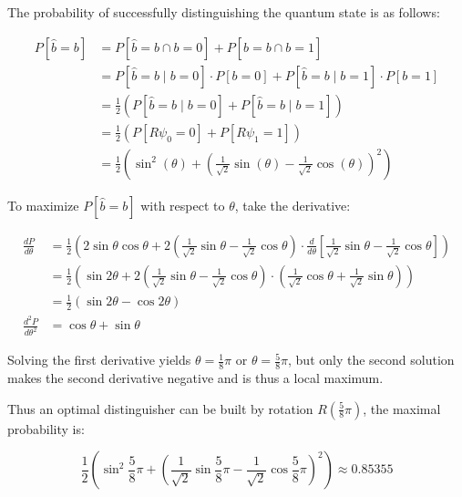 \documentclass{article}
\begin{document}
The probability of successfully distinguishing the quantum state is as follows:

\begin{equation*}
    \begin{aligned}
        P[\hat{b} = b]
        &= P[\hat{b} = b \cap b = 0] + P[\hat{b} = b \cap b = 1] \\
        &= P[\hat{b} = b \mid b = 0] \cdot P[b = 0] 
            + P[\hat{b} = b \mid b = 1] \cdot P[b = 1] \\
        &= \frac{1}{2}(P[\hat{b} = b \mid b = 0] + P[\hat{b} = b \mid b = 1]) \\
        &= \frac{1}{2}(P[R\psi_0 = 0] + P[R\psi_1 = 1]) \\
        &= \frac{1}{2}(\sin^2(\theta) + (
                \frac{1}{\sqrt{2}}\sin(\theta) - \frac{1}{\sqrt{2}}\cos(\theta)
            )^2)
    \end{aligned}
\end{equation*}

To maximize $P[\hat{b} = b]$ with respect to $\theta$, take the derivative:

\begin{equation*}
    \begin{aligned}
        \frac{dP}{d\theta}
        &= \frac{1}{2}\left(
            2\sin\theta\cos\theta
            + 2(
                \frac{1}{\sqrt{2}}\sin\theta - \frac{1}{\sqrt{2}}\cos\theta
            ) \cdot \frac{d}{d\theta}\left\lbrack 
                \frac{1}{\sqrt{2}}\sin\theta - \frac{1}{\sqrt{2}}\cos\theta
            \right\rbrack
        \right) \\
        &= \frac{1}{2}\left(
            \sin{2\theta}
            + 2(
                \frac{1}{\sqrt{2}}\sin\theta - \frac{1}{\sqrt{2}}\cos\theta
            ) \cdot \left(
                \frac{1}{\sqrt{2}}\cos\theta + \frac{1}{\sqrt{2}}\sin\theta
            \right)
        \right) \\
        &= \frac{1}{2}\left(
            \sin{2\theta} -\cos{2\theta}
        \right) \\
        \frac{d^2P}{d\theta^2} &= \cos{\theta} + \sin{\theta}
    \end{aligned}
\end{equation*}

Solving the first derivative yields $\theta = \frac{1}{8}\pi$ or $\theta = \frac{5}{8}\pi$, but only the second solution makes the second derivative negative and is thus a local maximum.

Thus an optimal distinguisher can be built by rotation $R(\frac{5}{8}\pi)$, the maximal probability is:

\begin{equation*}
    \frac{1}{2}\left(
        \sin^2{\frac{5}{8}\pi} + \left(
            \frac{1}{\sqrt{2}}\sin{\frac{5}{8}\pi} - \frac{1}{\sqrt{2}}\cos{\frac{5}{8}\pi}
        \right)^2
    \right)
    \approx 0.85355
\end{equation*}
\end{document}
